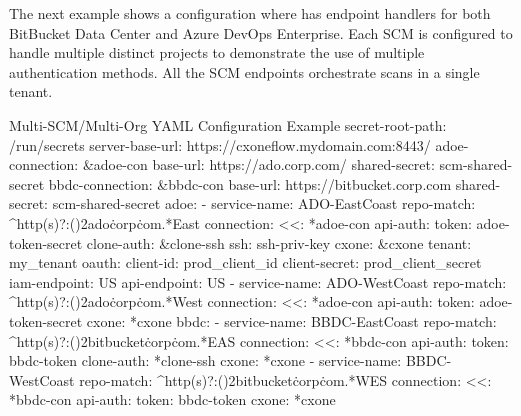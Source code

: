 \pagebreak
The next example shows a configuration where \cxoneflow has endpoint handlers for both
BitBucket Data Center and Azure DevOps Enterprise.  Each SCM is configured to handle multiple distinct
projects to demonstrate the use of multiple authentication methods.  All the SCM endpoints
orchestrate scans in a single \cxone tenant.

\begin{code}{Multi-SCM/Multi-Org YAML Configuration Example}{}{}
secret-root-path: /run/secrets
server-base-url: https://cxoneflow.mydomain.com:8443/
adoe-connection: &adoe-con
    base-url: https://ado.corp.com/
    shared-secret: scm-shared-secret
bbdc-connection: &bbdc-con
    base-url: https://bitbucket.corp.com
    shared-secret: scm-shared-secret
adoe:
    - service-name: ADO-EastCoast
        repo-match: ^http(s)?:(\/){2}ado\.corp\.com.*East
        connection:
        <<: *adoe-con
        api-auth: 
            token: adoe-token-secret
        clone-auth: &clone-ssh
            ssh: ssh-priv-key
        cxone: &cxone
        tenant: my_tenant
        oauth:
            client-id: prod_client_id
            client-secret: prod_client_secret
        iam-endpoint: US
        api-endpoint: US
    - service-name: ADO-WestCoast
        repo-match: ^http(s)?:(\/){2}ado\.corp\.com.*West
        connection:
        <<: *adoe-con
        api-auth:
            token: adoe-token-secret
        cxone: *cxone
bbdc:
    - service-name: BBDC-EastCoast
        repo-match: ^http(s)?:(\/){2}bitbucket\.corp\.com.*EAS
        connection:
        <<: *bbdc-con
        api-auth: 
            token: bbdc-token
        clone-auth: *clone-ssh
        cxone: *cxone
    - service-name: BBDC-WestCoast
        repo-match: ^http(s)?:(\/){2}bitbucket\.corp\.com.*WES
        connection:
        <<: *bbdc-con
        api-auth:
            token: bbdc-token
        cxone: *cxone
\end{code}
